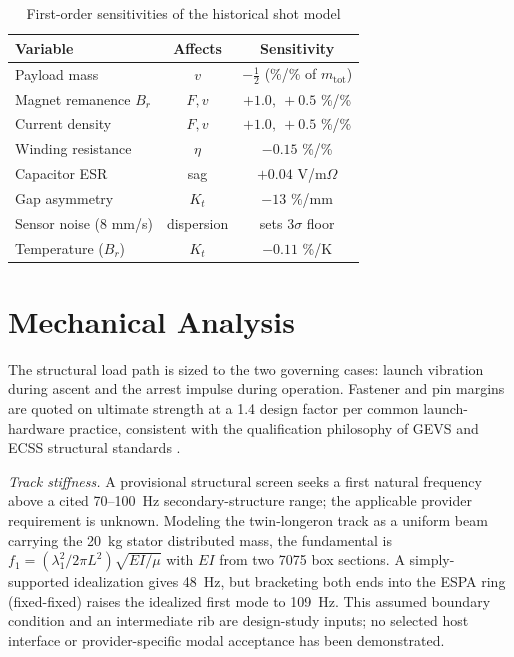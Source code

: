 \documentclass[conference]{IEEEtran}
\begin{document}
\begin{table}[t]
\caption{First-order sensitivities of the historical shot model}
\label{tab:sens}
\centering\footnotesize
\begin{tabular}{lcc}
\toprule
Variable & Affects & Sensitivity\\
\midrule
Payload mass & $v$ & $-\tfrac{1}{2}$ (\%/\% of $m_{\mathrm{tot}}$)\\
Magnet remanence $B_r$ & $F,v$ & $+1.0,\ +0.5$ \%/\%\\
Current density & $F,v$ & $+1.0,\ +0.5$ \%/\%\\
Winding resistance & $\eta$ & $-0.15$ \%/\%\\
Capacitor ESR & sag & $+0.04$ V/m$\Omega$\\
Gap asymmetry & $K_t$ & $-13$ \%/mm\\
Sensor noise (8 mm/s) & dispersion & sets 3$\sigma$ floor\\
Temperature ($B_r$) & $K_t$ & $-0.11$ \%/K\\
\bottomrule
\end{tabular}
\end{table}

\section{Mechanical Analysis}\label{sec:mech}
The structural load path is sized to the two governing cases: launch vibration during ascent and the arrest impulse during operation. Fastener and pin margins are quoted on ultimate strength at a 1.4 design factor per common launch-hardware practice, consistent with the qualification philosophy of GEVS \cite{gevs} and ECSS structural standards \cite{ecss}.

\emph{Track stiffness.} A provisional structural screen seeks a first natural frequency above a cited 70--100~Hz secondary-structure range; the applicable provider requirement is unknown. Modeling the twin-longeron track as a uniform beam carrying the 20~kg stator distributed mass, the fundamental is $f_1=(\lambda_1^2/2\pi L^2)\sqrt{EI/\mu}$ with $EI$ from two 7075 box sections. A simply-supported idealization gives 48~Hz, but bracketing both ends into the ESPA ring (fixed-fixed) raises the idealized first mode to 109~Hz. This assumed boundary condition and an intermediate rib are design-study inputs; no selected host interface or provider-specific modal acceptance has been demonstrated.
\end{document}
